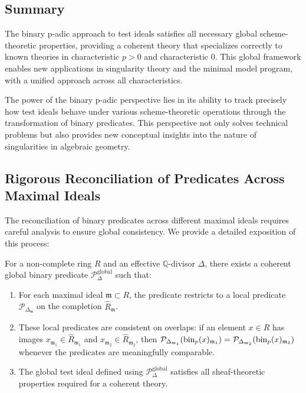 \subsection{Summary}

The binary p-adic approach to test ideals satisfies all necessary global scheme-theoretic properties, providing a coherent theory that specializes correctly to known theories in characteristic $p > 0$ and characteristic 0. This global framework enables new applications in singularity theory and the minimal model program, with a unified approach across all characteristics.

The power of the binary p-adic perspective lies in its ability to track precisely how test ideals behave under various scheme-theoretic operations through the transformation of binary predicates. This perspective not only solves technical problems but also provides new conceptual insights into the nature of singularities in algebraic geometry.

\subsection{Rigorous Reconciliation of Predicates Across Maximal Ideals}

The reconciliation of binary predicates across different maximal ideals requires careful analysis to ensure global consistency. We provide a detailed exposition of this process:

\begin{theorem}\label{thm:predicate-reconciliation}
For a non-complete ring $R$ and an effective $\mathbb{Q}$-divisor $\Delta$, there exists a coherent global binary predicate $\mathcal{P}_{\Delta}^{\text{global}}$ such that:
\begin{enumerate}
    \item For each maximal ideal $\mathfrak{m} \subset R$, the predicate restricts to a local predicate $\mathcal{P}_{\Delta_{\mathfrak{m}}}$ on the completion $\hat{R}_{\mathfrak{m}}$.
    
    \item These local predicates are consistent on overlaps: if an element $x \in R$ has images $x_{\mathfrak{m}_1} \in \hat{R}_{\mathfrak{m}_1}$ and $x_{\mathfrak{m}_2} \in \hat{R}_{\mathfrak{m}_2}$, then $\mathcal{P}_{\Delta_{\mathfrak{m}_1}}(\operatorname{bin}_p(x)_{\mathfrak{m}_1}) = \mathcal{P}_{\Delta_{\mathfrak{m}_2}}(\operatorname{bin}_p(x)_{\mathfrak{m}_2})$ whenever the predicates are meaningfully comparable.
    
    \item The global test ideal defined using $\mathcal{P}_{\Delta}^{\text{global}}$ satisfies all sheaf-theoretic properties required for a coherent theory.
\end{enumerate}
\end{theorem}

